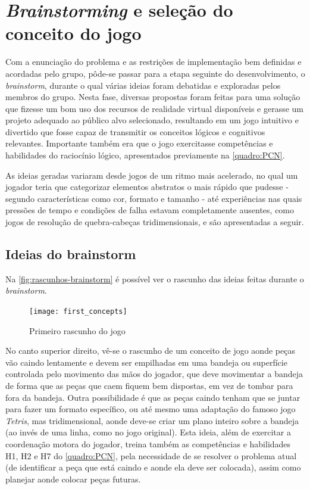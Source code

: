 \section{\textit{Brainstorming} e seleção do conceito do jogo}\label{sec-brainstorming-conceito}

Com a enunciação do problema e as restrições de implementação bem definidas 
e acordadas pelo grupo, pôde-se passar para a etapa seguinte do desenvolvimento, 
o \textit{brainstorm}, durante o qual várias ideias foram debatidas e 
exploradas pelos membros do grupo. Nesta fase, diversas propostas foram feitas 
para uma solução que fizesse um bom uso dos recursos de realidade 
virtual disponíveis e gerasse um projeto adequado ao público alvo 
selecionado, resultando em um jogo intuitivo e divertido que fosse 
capaz de transmitir os conceitos lógicos e cognitivos relevantes.
Importante também era que o jogo exercitasse competências e 
habilidades do raciocínio lógico, apresentados previamente na 
\autoref{quadro:PCN}.

As ideias geradas variaram desde jogos de um ritmo mais acelerado, no qual 
um jogador teria que categorizar elementos abstratos o mais rápido que 
pudesse - segundo características como cor, formato e tamanho - até experiências 
nas quais pressões de tempo e condições de falha estavam completamente 
ausentes, como jogos de resolução de quebra-cabeças tridimensionais, 
e são apresentadas a seguir.

\subsection{Ideias do brainstorm}\label{subsec-ideias-brainstorm}

Na \autoref{fig:rascunhos-brainstorm} é possível ver o rascunho das ideias feitas durante o \textit{brainstorm}. 

\begin{figure}[h]
	\centering
	\caption{Primeiro rascunho do jogo}
	\texttt{[image: first\_concepts]}
	\legend{\fonteAP}
	\label{fig:rascunhos-brainstorm}
\end{figure}

No canto superior direito, vê-se o rascunho de um conceito de jogo aonde 
peças vão caindo lentamente e devem ser empilhadas em uma bandeja ou 
superfície controlada pelo movimento das mãos do jogador, que deve 
movimentar a bandeja de forma que as peças que caem fiquem bem dispostas, 
em vez de tombar para fora da bandeja. Outra possibilidade é que as 
peças caindo tenham que se juntar para fazer um formato específico, 
ou até mesmo uma adaptação do famoso jogo \textit{Tetris}, mas 
tridimensional, aonde deve-se criar um plano inteiro sobre a bandeja 
(ao invés de uma linha, como no jogo original). Esta ideia, além de
exercitar a coordenação motora do jogador, treina também as 
competências e habilidades H1, H2 e H7 do \autoref{quadro:PCN}, pela
necessidade de se resolver o problema atual (de identificar a 
peça que está caindo e aonde ela deve ser colocada), assim como planejar
aonde colocar peças futuras.

